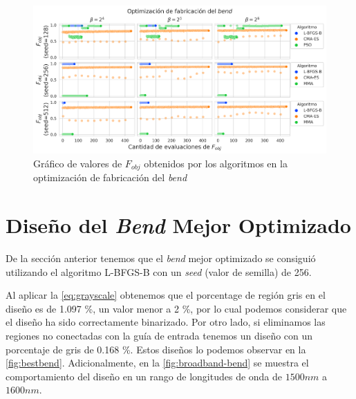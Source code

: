 \begin{landscape}
\begin{figure}[ht]
  \centering
  \includegraphics[scale=1.0]{image/results/bend/bend-opt-fab.png}
  \caption{Gráfico de valores de $F_{obj}$ obtenidos por los algoritmos en la optimización de fabricación del \emph{bend}}
  \label{fig:bend-fab}
\end{figure}
\end{landscape}

\section{Diseño del \emph{Bend} Mejor Optimizado}\label{sec:best-bend}

De la sección anterior tenemos que el \emph{bend} mejor optimizado se consiguió
utilizando el algoritmo L-BFGS-B con un \emph{seed} (valor de semilla) de 256.

Al aplicar la \autoref{eq:grayscale} obtenemos que el porcentage de región gris en el diseño
es de 1.097 \%, un valor menor a 2 \%, por lo cual podemos considerar que el diseño ha sido
correctamente binarizado. Por otro lado, si eliminamos las regiones no conectadas con la guía de entrada
tenemos un diseño con un porcentaje de gris de 0.168 \%.
Estos diseños lo podemos observar en la \autoref{fig:bestbend}.
Adicionalmente, en la \autoref{fig:broadband-bend} se muestra el comportamiento del diseño
en un rango de longitudes de onda de $1500nm$ a $1600 nm$.

